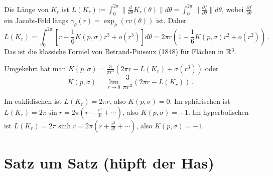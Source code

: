 \documentclass[a4paper,twoside,DIV15,BCOR12mm]{scrbook}
\renewcommand{\da}{\coloneqq}
\begin{document}
\begin{beispiel}
Die Länge von $K_r$ ist $L(K_r)\da \int_{0}^{2\pi} \|\frac d{d\theta} K_r(\theta) \| d\theta = \int_0^{2\pi} \|\frac{\partial f}{\partial \theta}\|d\theta $, wobei $\frac{\partial f}{\partial \theta}$ ein Jacobi-Feld längs $\gamma_\theta(r) = \exp_p(rv(\theta))$ ist. Daher \[ L(K_r) = \int_0^{2\pi} [r - \frac 1 6 K(p,\sigma) r^3 + o(r^3)] d\theta = 2\pi r(1 - \frac 1 6 K(p,\sigma)r^2 + o(r^2))\,.\] Das ist die klassiche Formel von Betrand-Puiseux (1848) für Flächen in $\mathbb{R}^3$.

Umgekehrt hat man $K(p,\sigma) = \frac3{\pi r^3} (2\pi r - L(K_r) + \sigma(r^3))$ oder \[ K(p,\sigma) = \lim_{r\to0} \frac 3{\pi r^3}(2\pi r - L(K_r))\,.\]

Im euklidischen ist $L(K_r) = 2\pi r$, also $K(p,\sigma) = 0$. Im sphärischen ist $L(K_r) = 2\pi \sin r = 2\pi(r - \frac{r^3}{3!} + \cdots )$, also $K(p,\sigma) = +1$. Im hyperbolischen ist $L(K_r) = 2\pi \sinh r = 2\pi (r + \frac{r^3}{3!} +\cdots)$, also $K(p,\sigma) = -1$.

\end{beispiel}





\appendix



\chapter{Satz um Satz (hüpft der Has)}

\renewcommand{\indexname}{Stichwortverzeichnis}
\addtocounter{chapter}{1}
\printindex
\end{document}
